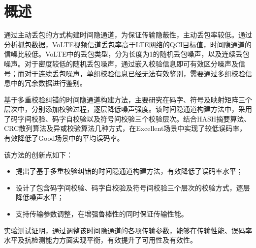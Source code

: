 \section{概述}
\label{chap:hash:overview}

通过主动丢包的方式构建时间隐通道，为保证传输隐蔽性，主动丢包率较低。通过分析抓包数据，VoLTE视频信道丢包率高于LTE网络的QCI目标值，时间隐通道的信噪比较低。VoLTE中的丢包类型，分为长度为1的随机丢包噪声，以及连续丢包噪声。对于密度较低的随机丢包噪声，通过嵌入校验信息即可有效区分噪声及信号；而对于连续丢包噪声，单组校验信息已经无法有效鉴别，需要通过多组校验信息中的冗余数据进行鉴别。

基于多重校验纠错的时间隐通道构建方法，主要研究在码字、符号及映射矩阵三个层次中，分别添加校验过程，逐层降低噪声强度。该时间隐通道构建方法中，采用了码字间校验、码字自校验以及符号间校验三个校验层次。结合HASH摘要算法、CRC散列算法及异或校验算法几种方式，在Excellent场景中实现了较低误码率，有效降低了Good场景中的平均误码率。

该方法的创新点如下：
\begin{itemize}
	\item 提出了基于多重校验纠错的时间隐通道构建方法，有效降低了误码率水平；
	\item 设计了包含码字间校验、码字自校验及符号间校验三个层次的校验方式，逐层降低噪声水平；
	\item 支持传输参数调整，在增强鲁棒性的同时保证传输性能。
\end{itemize}

实验测试证明，通过调整该时间隐通道的各项传输参数，能够在传输性能、误码率水平及抗检测能力方面实现平衡，有效提升了可用性及有效性。
